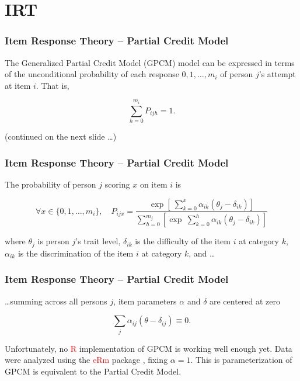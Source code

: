 \documentclass[10pt,utf8x]{beamer}
\begin{document}
\section{IRT}
\begin{frame}
  \frametitle{Item Response Theory -- Partial Credit Model}

The Generalized Partial Credit Model (GPCM) model can be expressed in terms
of the unconditional probability of each
response $0, 1, \dots, m_i$ of person $j$'s attempt at item $i$. That is,

\begin{displaymath}
\sum_{h=0}^{m_i}P_{ijh} = 1.
\end{displaymath}

(continued on the next slide \dots)
\end{frame}

\begin{frame}
  \frametitle{Item Response Theory -- Partial Credit Model}

The probability of person $j$ scoring $x$ on item $i$ is

\begin{displaymath}
\forall x \in \{0,1,\dots,m_i\}, \quad
P_{ijx} =
\frac{\exp\left[\ \displaystyle\sum_{k=0}^{x} \alpha_{ik}(\theta_j - \delta_{ik})\right]}
{\displaystyle\sum_{h=0}^{m_j}
\left[\exp\ \displaystyle\sum_{k=0}^{h}\alpha_{ik}(\theta_j - \delta_{ik})\right]}
\end{displaymath}

where $\theta_j$ is person $j$'s trait level,
$\delta_{ik}$ is the difficulty of the item $i$ at category $k$,
$\alpha_{ik}$ is the discrimination of the item $i$ at category $k$, and \dots
\end{frame}

\begin{frame}
  \frametitle{Item Response Theory -- Partial Credit Model}

\dots summing across all persons $j$,
item parameters $\alpha$ and $\delta$ are centered at zero

\begin{displaymath}
\sum_j\alpha_{ij}(\theta - \delta_{ij}) \equiv 0.
\end{displaymath}

Unfortunately, no \textcolor{red}{R} implementation of GPCM is
working well enough yet.
Data were analyzed using the \textcolor{red}{eRm} package \cite{erm2011}, fixing $\alpha=1$.
This is parameterization of GPCM is equivalent to the Partial Credit Model.
\end{frame}
\end{document}
